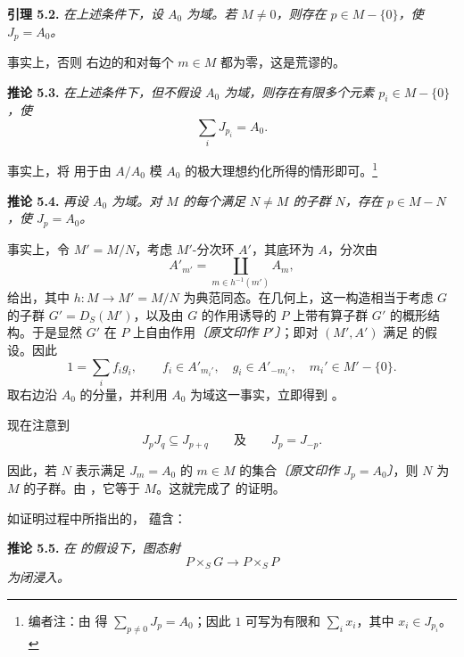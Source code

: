 \medskip
\noindent{}\textbf{引理 5.2.}
\textit{在上述条件下，设 \(A_0\) 为域。若 \(M\ne0\)，则存在 \(p\in M-\{0\}\)，使 \(J_p=A_0\)。}

事实上，否则  右边的和对每个 \(m\in M\) 都为零，这是荒谬的。

\medskip
\noindent{}\textbf{推论 5.3.}
\textit{在上述条件下，但不假设 \(A_0\) 为域，则存在有限多个元素 \(p_i\in M-\{0\}\)，使}
\[
  \sum_iJ_{p_i}=A_0.
\]

事实上，将  用于由 \(A/A_0\) 模 \(A_0\) 的极大理想约化所得的情形即可。\footnote{编者注：由  得 \(\sum_{p\ne0}J_p=A_0\)；因此 \(1\) 可写为有限和 \(\sum_i x_i\)，其中 \(x_i\in J_{p_i}\)。}

\medskip
\noindent{}\textbf{推论 5.4.}
\textit{再设 \(A_0\) 为域。对 \(M\) 的每个满足 \(N\ne M\) 的子群 \(N\)，存在 \(p\in M-N\)，使 \(J_p=A_0\)。}

事实上，令 \(M'=M/N\)，考虑 \(M'\)-分次环 \(A'\)，其底环为 \(A\)，分次由
\[
  A'_{m'}=\coprod_{m\in h^{-1}(m')}A_m,
\]
给出，其中 \(h:M\to M'=M/N\) 为典范同态。在几何上，这一构造相当于考虑 \(G\) 的子群 \(G'=D_S(M')\)，以及由 \(G\) 的作用诱导的 \(P\) 上带有算子群 \(G'\) 的概形结构。于是显然 \(G'\) 在 \(P\) 上自由作用\emph{〔原文印作 \(P'\)〕}；即对 \((M',A')\) 满足  的假设。因此
\[
  1=\sum_i f_i g_i,
  \qquad
  f_i\in A'_{m_i'},\quad
  g_i\in A'_{-m_i'},\quad
  m_i'\in M'-\{0\}.
\]
取右边沿 \(A_0\) 的分量，并利用 \(A_0\) 为域这一事实，立即得到 。

现在注意到
\[
  J_pJ_q\subseteq J_{p+q}
  \qquad\text{及}\qquad
  J_p=J_{-p}.
\]

因此，若 \(N\) 表示满足 \(J_m=A_0\) 的 \(m\in M\) 的集合\emph{〔原文印作 \(J_p=A_0\)〕}，则 \(N\) 为 \(M\) 的子群。由 ，它等于 \(M\)。这就完成了 的证明。

如证明过程中所指出的， 蕴含：

\medskip
\noindent{}\textbf{推论 5.5.}
\textit{在  的假设下，图态射}
\[
  P\times_SG\longrightarrow P\times_SP
\]
\textit{为闭浸入。}

